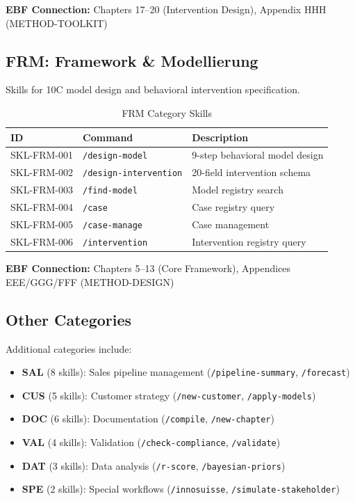 \textbf{EBF Connection:} Chapters 17--20 (Intervention Design), Appendix HHH (METHOD-TOOLKIT)

\subsection{FRM: Framework \& Modellierung}

Skills for 10C model design and behavioral intervention specification.

\begin{table}[h]
\centering
\begin{tabular}{|l|l|l|}
\hline
\textbf{ID} & \textbf{Command} & \textbf{Description} \\
\hline
SKL-FRM-001 & \texttt{/design-model} & 9-step behavioral model design \\
SKL-FRM-002 & \texttt{/design-intervention} & 20-field intervention schema \\
SKL-FRM-003 & \texttt{/find-model} & Model registry search \\
SKL-FRM-004 & \texttt{/case} & Case registry query \\
SKL-FRM-005 & \texttt{/case-manage} & Case management \\
SKL-FRM-006 & \texttt{/intervention} & Intervention registry query \\
\hline
\end{tabular}
\caption{FRM Category Skills}
\end{table}

\textbf{EBF Connection:} Chapters 5--13 (Core Framework), Appendices EEE/GGG/FFF (METHOD-DESIGN)

\subsection{Other Categories}

Additional categories include:
\begin{itemize}
\item \textbf{SAL} (8 skills): Sales pipeline management (\texttt{/pipeline-summary}, \texttt{/forecast})
\item \textbf{CUS} (5 skills): Customer strategy (\texttt{/new-customer}, \texttt{/apply-models})
\item \textbf{DOC} (6 skills): Documentation (\texttt{/compile}, \texttt{/new-chapter})
\item \textbf{VAL} (4 skills): Validation (\texttt{/check-compliance}, \texttt{/validate})
\item \textbf{DAT} (3 skills): Data analysis (\texttt{/r-score}, \texttt{/bayesian-priors})
\item \textbf{SPE} (2 skills): Special workflows (\texttt{/innosuisse}, \texttt{/simulate-stakeholder})
\end{itemize}

